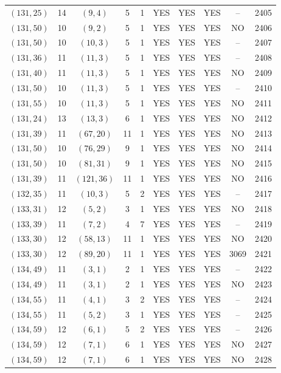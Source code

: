 \begin{longtable}{|c|c|c|c|c|c|c|c|c|c|}
$(131, 25)$ & 14 & $(9, 4)$ & 5 & 1 & YES & YES & YES & -- & 2405\\
$(131, 50)$ & 10 & $(9, 2)$ & 5 & 1 & YES & YES & YES & NO & 2406\\
$(131, 50)$ & 10 & $(10, 3)$ & 5 & 1 & YES & YES & YES & -- & 2407\\
$(131, 36)$ & 11 & $(11, 3)$ & 5 & 1 & YES & YES & YES & -- & 2408\\
$(131, 40)$ & 11 & $(11, 3)$ & 5 & 1 & YES & YES & YES & NO & 2409\\
$(131, 50)$ & 10 & $(11, 3)$ & 5 & 1 & YES & YES & YES & -- & 2410\\
$(131, 55)$ & 10 & $(11, 3)$ & 5 & 1 & YES & YES & YES & NO & 2411\\
$(131, 24)$ & 13 & $(13, 3)$ & 6 & 1 & YES & YES & YES & NO & 2412\\
$(131, 39)$ & 11 & $(67, 20)$ & 11 & 1 & YES & YES & YES & NO & 2413\\
$(131, 50)$ & 10 & $(76, 29)$ & 9 & 1 & YES & YES & YES & NO & 2414\\
$(131, 50)$ & 10 & $(81, 31)$ & 9 & 1 & YES & YES & YES & NO & 2415\\
$(131, 39)$ & 11 & $(121, 36)$ & 11 & 1 & YES & YES & YES & NO & 2416\\
$(132, 35)$ & 11 & $(10, 3)$ & 5 & 2 & YES & YES & YES & -- & 2417\\
$(133, 31)$ & 12 & $(5, 2)$ & 3 & 1 & YES & YES & YES & NO & 2418\\
$(133, 39)$ & 11 & $(7, 2)$ & 4 & 7 & YES & YES & YES & -- & 2419\\
$(133, 30)$ & 12 & $(58, 13)$ & 11 & 1 & YES & YES & YES & NO & 2420\\
$(133, 30)$ & 12 & $(89, 20)$ & 11 & 1 & YES & YES & YES & 3069 & 2421\\
$(134, 49)$ & 11 & $(3, 1)$ & 2 & 1 & YES & YES & YES & -- & 2422\\
$(134, 49)$ & 11 & $(3, 1)$ & 2 & 1 & YES & YES & YES & NO & 2423\\
$(134, 55)$ & 11 & $(4, 1)$ & 3 & 2 & YES & YES & YES & -- & 2424\\
$(134, 55)$ & 11 & $(5, 2)$ & 3 & 1 & YES & YES & YES & -- & 2425\\
$(134, 59)$ & 12 & $(6, 1)$ & 5 & 2 & YES & YES & YES & -- & 2426\\
$(134, 59)$ & 12 & $(7, 1)$ & 6 & 1 & YES & YES & YES & NO & 2427\\
$(134, 59)$ & 12 & $(7, 1)$ & 6 & 1 & YES & YES & YES & NO & 2428\\

\end{longtable}
